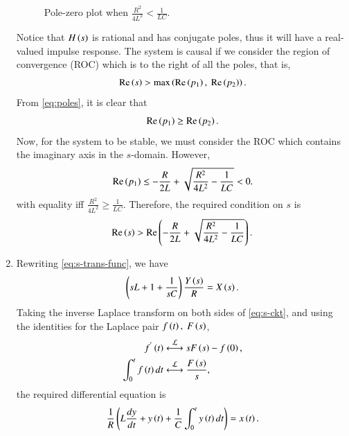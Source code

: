 \documentclass[journal,12pt,twocolumn]{IEEEtran}
\begin{document}
\begin{enumerate}[label=\theenumi.]
\begin{figure}[!ht]
        \caption{Pole-zero plot when \(\frac{R^2}{4L^2} < \frac{1}{LC}\).}
        \label{fig:pole-zero-underdamping}
    \end{figure}
    Notice that \(H\left(s\right)\) is rational and has conjugate poles, thus it will have
    a real-valued impulse response. The system is causal if we consider the
    region of convergence (ROC) which is to the right of all the poles, that is,
    \begin{equation}
        \re\brak{s} > \max\brak{\re\brak{p_1},\ \re\brak{p_2}}.
        \label{eq:causal-roc}
    \end{equation}
    From \eqref{eq:poles}, it is clear that
    \begin{equation}
        \mathop{\mathrm{Re}}\left(p_1\right) \ge \mathop{\mathrm{Re}}\left(p_2\right).
    \end{equation}
    Now, for the system to be stable, we must consider the ROC which contains
    the imaginary axis in the \(s\)-domain. However,
    \begin{equation}
        \mathop{\mathrm{Re}}\left(p_1\right) \le -\frac{R}{2L} + \sqrt{\frac{R^2}{4L^2}-\frac{1}{LC}} < 0.
        \label{eq:real-p1}
    \end{equation}
    with equality iff \(\frac{R^2}{4L^2} \ge \frac{1}{LC}\). Therefore, the
    required condition on \(s\) is
    \begin{equation}
        \mathop{\mathrm{Re}}\left(s\right) > \mathop{\mathrm{Re}}\left(-\frac{R}{2L} + \sqrt{\frac{R^2}{4L^2} - \frac{1}{LC}}\right).
        \label{eq:condition-s}
    \end{equation}

    \item Rewriting \eqref{eq:s-trans-func}, we have
    \begin{equation}
        \left(sL+1+\frac{1}{sC}\right)\frac{Y\left(s\right)}{R} = X\left(s\right).
        \label{eq:s-ckt}
    \end{equation}
    Taking the inverse Laplace transform on both sides of \eqref{eq:s-ckt},
    and using the identities for the Laplace pair \(f\brak{t},\ F\brak{s}\),
    \begin{align}
        f^{'}\left(t\right) &\overset{\mathcal{L}}{ \longleftrightarrow} sF\left(s\right) - f\left(0\right), \label{eq:laplace-diff} \\
        \int_{0}^tf\left(t\right)dt &\overset{\mathcal{L}}{ \longleftrightarrow} \frac{F\left(s\right)}{s}, \label{eq:laplace-int}
    \end{align}
    the required differential equation is
    \begin{equation}
        \frac{1}{R}\left(L\frac{dy}{dt} + y\left(t\right) + \frac{1}{C}\int_{0}^ty\left(t\right)dt\right) = x\left(t\right).
        \label{eq:diff-rlc-s}
    \end{equation}


\end{enumerate}
\end{document}
